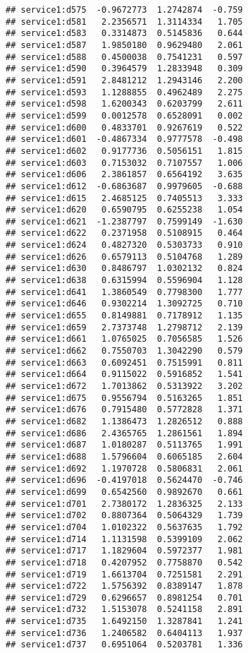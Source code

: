 \documentclass[
]{article}
\begin{document}
\begin{verbatim}
## service1:d575  -0.9672773  1.2742874  -0.759
## service1:d581   2.2356571  1.3114334   1.705
## service1:d583   0.3314873  0.5145836   0.644
## service1:d587   1.9850180  0.9629480   2.061
## service1:d588   0.4500038  0.7541231   0.597
## service1:d590   0.3964579  1.2833948   0.309
## service1:d591   2.8481212  1.2943146   2.200
## service1:d593   1.1288855  0.4962489   2.275
## service1:d598   1.6200343  0.6203799   2.611
## service1:d599   0.0012578  0.6528091   0.002
## service1:d600   0.4833701  0.9267619   0.522
## service1:d601  -0.4867334  0.9777578  -0.498
## service1:d602   0.9177736  0.5056151   1.815
## service1:d603   0.7153032  0.7107557   1.006
## service1:d606   2.3861857  0.6564192   3.635
## service1:d612  -0.6863687  0.9979605  -0.688
## service1:d615   2.4685125  0.7405513   3.333
## service1:d620   0.6590795  0.6255238   1.054
## service1:d621  -1.2387797  0.7599149  -1.630
## service1:d622   0.2371958  0.5108915   0.464
## service1:d624   0.4827320  0.5303733   0.910
## service1:d626   0.6579113  0.5104768   1.289
## service1:d630   0.8486797  1.0302132   0.824
## service1:d638   0.6315994  0.5596904   1.128
## service1:d641   1.3860549  0.7798300   1.777
## service1:d646   0.9302214  1.3092725   0.710
## service1:d655   0.8149881  0.7178912   1.135
## service1:d659   2.7373748  1.2798712   2.139
## service1:d661   1.0765025  0.7056585   1.526
## service1:d662   0.7550703  1.3042290   0.579
## service1:d663   0.6092451  0.7515991   0.811
## service1:d664   0.9115022  0.5916852   1.541
## service1:d672   1.7013862  0.5313922   3.202
## service1:d675   0.9556794  0.5163265   1.851
## service1:d676   0.7915480  0.5772828   1.371
## service1:d682   1.1386473  1.2826512   0.888
## service1:d686   2.4365765  1.2861561   1.894
## service1:d687   1.0180287  0.5113765   1.991
## service1:d688   1.5796604  0.6065185   2.604
## service1:d692   1.1970728  0.5806831   2.061
## service1:d696  -0.4197018  0.5624470  -0.746
## service1:d699   0.6542560  0.9892670   0.661
## service1:d701   2.7380172  1.2836325   2.133
## service1:d702   0.8807364  0.5064329   1.739
## service1:d704   1.0102322  0.5637635   1.792
## service1:d714   1.1131598  0.5399109   2.062
## service1:d717   1.1829604  0.5972377   1.981
## service1:d718   0.4207952  0.7758870   0.542
## service1:d719   1.6613704  0.7251581   2.291
## service1:d722   1.5756392  0.8389147   1.878
## service1:d729   0.6296657  0.8981254   0.701
## service1:d732   1.5153078  0.5241158   2.891
## service1:d735   1.6492150  1.3287841   1.241
## service1:d736   1.2406582  0.6404113   1.937
## service1:d737   0.6951064  0.5203781   1.336

\end{verbatim}
\end{document}
